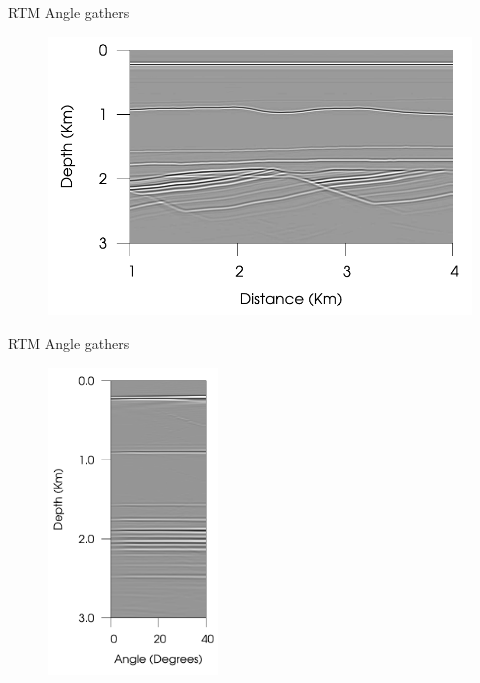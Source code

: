 \documentclass[xcolor=dvipsnames,notes]{beamer}
\begin{document}
\begin{frame}{RTM Angle gathers}
\begin{figure}
\includegraphics[width=\textwidth]{Fig/fig13.pdf}
\end{figure}
\end{frame}
\begin{frame}{RTM Angle gathers}
\begin{figure}
\includegraphics[width=0.4\textwidth]{Fig/fig14.pdf}
\end{figure}
\end{frame}
\end{document}
